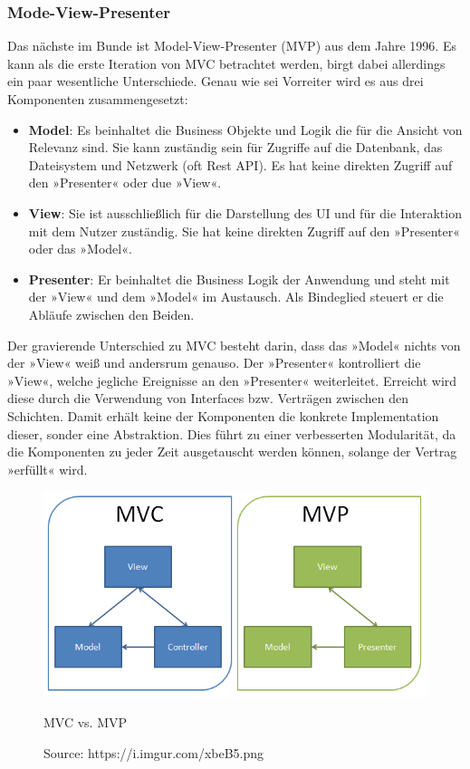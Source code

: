 \subsubsection{Mode-View-Presenter}
Das nächste im Bunde ist Model-View-Presenter (MVP) aus dem Jahre 1996.
\cite{modelViewPresenterTheTaligentMikePotel1996, modelViewPresenterMartinFowler2006}
Es kann als die erste Iteration von MVC betrachtet werden, birgt dabei allerdings ein paar wesentliche 
Unterschiede. Genau wie sei Vorreiter wird es aus drei Komponenten zusammengesetzt:

\begin{itemize}
	\item \textbf{Model}: Es beinhaltet die Business Objekte und Logik die für die Ansicht von Relevanz sind. Sie kann zuständig sein für Zugriffe auf die Datenbank, das Dateisystem und Netzwerk (oft Rest API). Es hat keine direkten Zugriff auf den »Presenter« oder due »View«.
	\item \textbf{View}: Sie ist ausschließlich für die Darstellung des UI und für die Interaktion mit dem Nutzer zuständig. Sie hat keine direkten Zugriff auf den »Presenter« oder das »Model«.
	\item \textbf{Presenter}: Er beinhaltet die Business Logik der Anwendung und steht mit der »View« und dem »Model« im Austausch. Als Bindeglied steuert er die Abläufe zwischen den Beiden.
\end{itemize}
Der gravierende Unterschied zu MVC besteht darin, dass das »Model« nichts von der »View« weiß und andersrum genauso. Der »Presenter« kontrolliert die »View«, welche jegliche Ereignisse an den »Presenter« weiterleitet. Erreicht wird diese durch die Verwendung von Interfaces bzw. Verträgen zwischen den Schichten. Damit erhält keine der Komponenten die konkrete Implementation dieser, sonder eine Abstraktion. Dies führt zu einer verbesserten Modularität, da die Komponenten zu jeder Zeit ausgetauscht werden können, solange der Vertrag »erfüllt« wird.
\begin{figure}[ht]
	\centering
	\includegraphics[height=0.45\textwidth]{./images/mvp-vs-mvc.png}
	\caption{MVC vs. MVP}
	\caption*{Source: https://i.imgur.com/xbeB5.png}
	\label{fig:mvc}
\end{figure}
\clearpage

